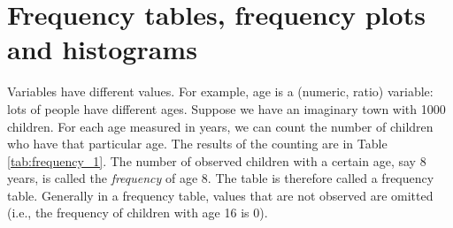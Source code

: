 % 
% 
% 





\section{Frequency tables, frequency plots and histograms}

Variables have different values. For example, age is a (numeric, ratio) variable: lots of people have different ages. Suppose we have an imaginary town with 1000 children. For each age measured in years, we can count the number of children who have that particular age. The results of the counting are in Table \ref{tab:frequency_1}. The number of observed children with a certain age, say 8 years, is called the \textit{frequency} of age 8. The table is therefore called a frequency table. Generally in a frequency table, values that are not observed are omitted (i.e., the frequency of children with age 16 is 0).

